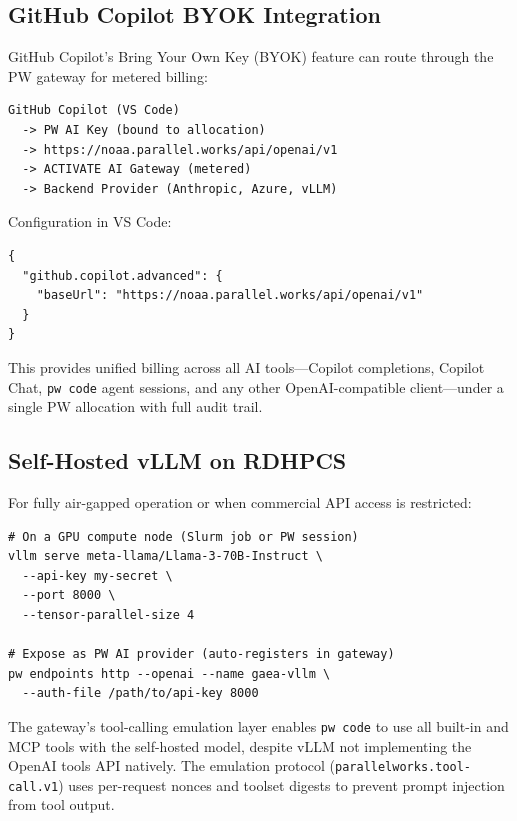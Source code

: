 \documentclass[11pt,letterpaper,twoside]{article}
\begin{document}
\subsection{GitHub Copilot BYOK Integration}

GitHub Copilot's Bring Your Own Key (BYOK) feature can route through the PW
gateway for metered billing:

\begin{lstlisting}[style=diagram]
GitHub Copilot (VS Code)
  -> PW AI Key (bound to allocation)
  -> https://noaa.parallel.works/api/openai/v1
  -> ACTIVATE AI Gateway (metered)
  -> Backend Provider (Anthropic, Azure, vLLM)
\end{lstlisting}

Configuration in VS Code:
\begin{lstlisting}[style=json]
{
  "github.copilot.advanced": {
    "baseUrl": "https://noaa.parallel.works/api/openai/v1"
  }
}
\end{lstlisting}

This provides unified billing across all AI tools---Copilot completions,
Copilot Chat, \texttt{pw code} agent sessions, and any other
OpenAI-compatible client---under a single PW allocation with full audit
trail.

\subsection{Self-Hosted vLLM on RDHPCS}

For fully air-gapped operation or when commercial API access is restricted:

\begin{lstlisting}[style=bash]
# On a GPU compute node (Slurm job or PW session)
vllm serve meta-llama/Llama-3-70B-Instruct \
  --api-key my-secret \
  --port 8000 \
  --tensor-parallel-size 4

# Expose as PW AI provider (auto-registers in gateway)
pw endpoints http --openai --name gaea-vllm \
  --auth-file /path/to/api-key 8000
\end{lstlisting}

The gateway's tool-calling emulation layer enables \texttt{pw code} to use
all built-in and MCP tools with the self-hosted model, despite vLLM not
implementing the OpenAI tools API natively. The emulation protocol
(\texttt{parallelworks.tool-call.v1}) uses per-request nonces and toolset
digests to prevent prompt injection from tool output.

\end{document}

